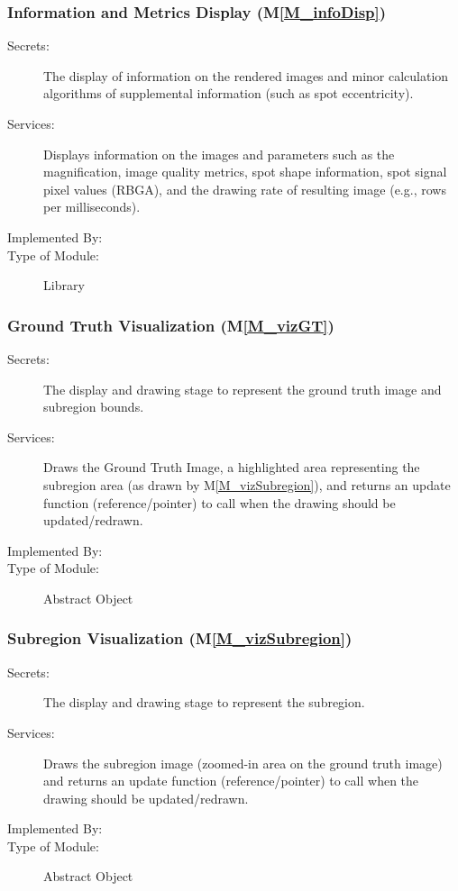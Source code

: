 \documentclass[12pt, titlepage]{article}
\newcommand{\mref}[1]{M\ref{#1}}
\begin{document}
\subsubsection{Information and Metrics Display (\mref{M_infoDisp})}
\begin{description}
\item[Secrets:] The display of information on the rendered
  images and minor calculation algorithms of supplemental information (such as spot eccentricity).
\item[Services:] Displays information on the images and parameters such as the magnification,
  image quality metrics, spot shape information, spot signal pixel values (RBGA),
  and the drawing rate of resulting image (e.g., rows per milliseconds).
\item[Implemented By:] \progname{}
\item[Type of Module:] Library
\end{description}


\subsubsection{Ground Truth Visualization (\mref{M_vizGT})}
\begin{description}
\item[Secrets:] The display and drawing stage to represent the ground truth image and subregion bounds.
\item[Services:] Draws the Ground Truth Image, a highlighted area representing the subregion
  area (as drawn by \mref{M_vizSubregion}), and returns an update function (reference/pointer)
  to call when the drawing should be updated/redrawn.
\item[Implemented By:] \progname{}
\item[Type of Module:] Abstract Object
\end{description}


\subsubsection{Subregion Visualization (\mref{M_vizSubregion})}
\begin{description}
\item[Secrets:] The display and drawing stage to represent the subregion.
\item[Services:] Draws the subregion image (zoomed-in area on the ground truth image) 
  and returns an update function (reference/pointer) to call when the drawing should 
  be updated/redrawn.
\item[Implemented By:] \progname{}
\item[Type of Module:] Abstract Object
\end{description}
\end{document}
